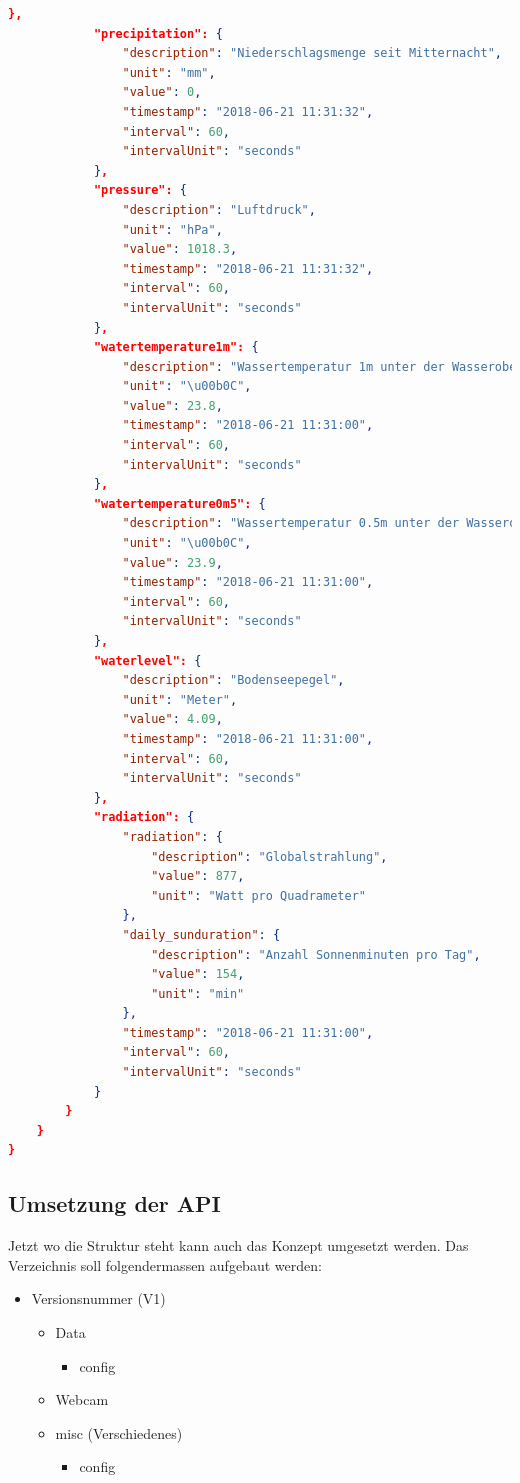 \begin{lstlisting}[label=lst:Referenz,caption=Titel, language=JSON]
			},
			"precipitation": {
				"description": "Niederschlagsmenge seit Mitternacht",
				"unit": "mm",
				"value": 0,
				"timestamp": "2018-06-21 11:31:32",
				"interval": 60,
				"intervalUnit": "seconds"
			},
			"pressure": {
				"description": "Luftdruck",
				"unit": "hPa",
				"value": 1018.3,
				"timestamp": "2018-06-21 11:31:32",
				"interval": 60,
				"intervalUnit": "seconds"
			},
			"watertemperature1m": {
				"description": "Wassertemperatur 1m unter der Wasseroberfl\u00e4che",
				"unit": "\u00b0C",
				"value": 23.8,
				"timestamp": "2018-06-21 11:31:00",
				"interval": 60,
				"intervalUnit": "seconds"
			},
			"watertemperature0m5": {
				"description": "Wassertemperatur 0.5m unter der Wasseroberfl\u00e4che",
				"unit": "\u00b0C",
				"value": 23.9,
				"timestamp": "2018-06-21 11:31:00",
				"interval": 60,
				"intervalUnit": "seconds"
			},
			"waterlevel": {
				"description": "Bodenseepegel",
				"unit": "Meter",
				"value": 4.09,
				"timestamp": "2018-06-21 11:31:00",
				"interval": 60,
				"intervalUnit": "seconds"
			},
			"radiation": {
				"radiation": {
					"description": "Globalstrahlung",
					"value": 877,
					"unit": "Watt pro Quadrameter"
				},
				"daily_sunduration": {
					"description": "Anzahl Sonnenminuten pro Tag",
					"value": 154,
					"unit": "min"
				},
				"timestamp": "2018-06-21 11:31:00",
				"interval": 60,
				"intervalUnit": "seconds"
			}
		}
	}
}

\end{lstlisting}

\subsection{Umsetzung der API}

Jetzt wo die Struktur steht kann auch das Konzept umgesetzt werden. Das Verzeichnis soll folgendermassen aufgebaut werden:

\begin{itemize}
\item Versionsnummer (V1)
\begin{itemize}
\item Data
\begin{itemize}
\item config
\end{itemize}
\item Webcam
\item misc (Verschiedenes)
\begin{itemize}
\item config
\end{itemize}
\end{itemize}
\end{itemize}

